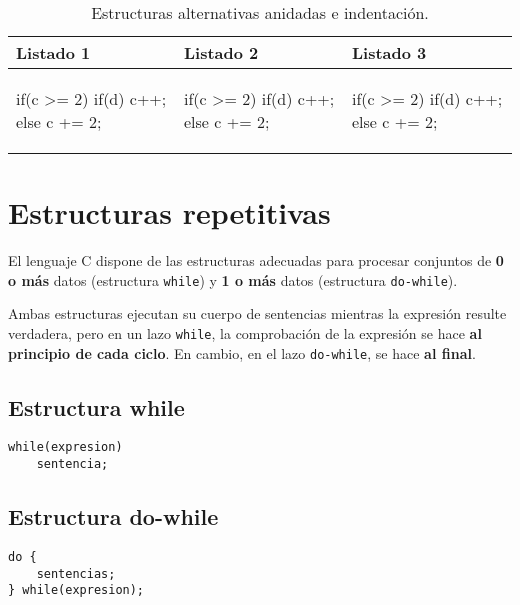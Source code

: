 \begin{table}
\centering
\begin{tabular}{l|l|l}
Listado 1 & Listado 2 & Listado 3\\
\hline
\begin{codecell}
if(c >= 2) {
    if(d)
        c++;
} else
    c += 2;
\end{codecell}
&
\begin{codecell}
if(c >= 2) 
    if(d)
        c++;
else
    c += 2;
\end{codecell}
&
\begin{codecell}
if(c >= 2) { 
    if(d)
        c++;
	else
    	c += 2;
}
\end{codecell}\\
\end{tabular}
\caption{Estructuras alternativas anidadas e indentación.}
\label{tab:indent}
\end{table}



\section{Estructuras repetitivas}

El lenguaje C dispone de las estructuras adecuadas para procesar conjuntos de \textbf{0 o más}
datos (estructura \lstinline{while}) y \textbf{1 o más} datos (estructura \lstinline{do-while}).

Ambas estructuras ejecutan su cuerpo de sentencias mientras la expresión
resulte verdadera, pero en un lazo \lstinline{while}, la comprobación de la expresión se hace \textbf{al principio de cada
ciclo}. En cambio, en el lazo \lstinline{do-while}, se hace \textbf{al final}.


\subsection{Estructura while}
\begin{lstlisting}
while(expresion)
    sentencia;
\end{lstlisting}

\subsection{Estructura do-while}
\begin{lstlisting}
do {
    sentencias;
} while(expresion);
\end{lstlisting}


